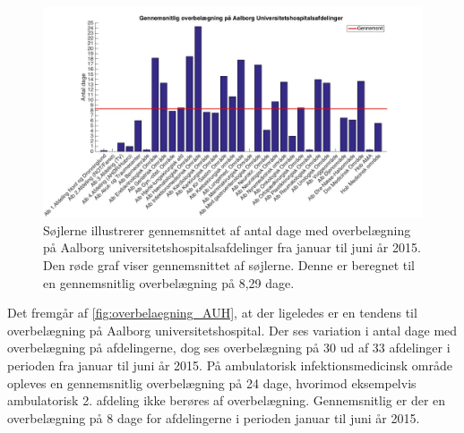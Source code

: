 \begin{figure}[H]
\centering
\includegraphics[width=1\textwidth]{figures/overbelaegning_AUH}
\caption{Søjlerne illustrerer gennemsnittet af antal dage med overbelægning på Aalborg universitetshospitalsafdelinger fra januar til juni år 2015. \cite{SDS2015} Den røde graf viser gennemsnittet af søjlerne. Denne er beregnet til en gennemsnitlig overbelægning på 8,29 dage.}
\label{fig:overbelaegning_AUH}
\end{figure}

\noindent
Det fremgår af \autoref{fig:overbelaegning_AUH}, at der ligeledes er en tendens til overbelægning på Aalborg universitetshospital. Der ses variation i antal dage med overbelægning på afdelingerne, dog ses overbelægning på 30 ud af 33 afdelinger i perioden fra januar til juni år 2015. På ambulatorisk infektionsmedicinsk område opleves en gennemsnitlig overbelægning på 24 dage, hvorimod eksempelvis ambulatorisk 2. afdeling ikke berøres af overbelægning. Gennemsnitlig er der en overbelægning på 8 dage for afdelingerne i perioden januar til juni år 2015.

